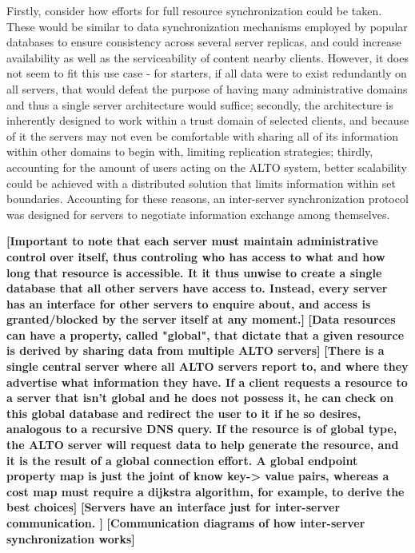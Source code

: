     Firstly, consider how efforts for full resource synchronization could be taken.
    These would be similar to data synchronization mechanisms employed by popular databases to ensure consistency across several server replicas, and could increase availability as well as the serviceability of content nearby clients.
    However, it does not seem to fit this use case - for starters, if all data were to exist redundantly on all servers, that would defeat the purpose of having many administrative domains and thus a single server architecture would suffice; secondly, the architecture is inherently designed to work within a trust domain of selected clients, and because of it the servers may not even be comfortable with sharing all of its information within other domains to begin with, limiting replication strategies; thirdly, accounting for the amount of users acting on the ALTO system, better scalability could be achieved with a distributed solution that limits information within set boundaries.
    Accounting for these reasons, an inter-server synchronization protocol was designed for servers to negotiate information exchange among themselves.

    \textbf{[Important to note that each server must maintain administrative control over itself, thus controling who has access to what and how long that resource is accessible. It it thus unwise to create a single database that all other servers have access to. Instead, every server has an interface for other servers to enquire about, and access is granted/blocked by the server itself at any moment.]}
    \textbf{[Data resources can have a property, called "global", that dictate that a given resource is derived by sharing data from multiple ALTO servers]}
    \textbf{[There is a single central server where all ALTO servers report to, and where they advertise what information they have. If a client requests a resource to a server that isn't global and he does not possess it, he can check on this global database and redirect the user to it if he so desires, analogous to a recursive DNS query. If the resource is of global type, the ALTO server will request data to help generate the resource, and it is the result of a global connection effort. A global endpoint property map is just the joint of know key-> value pairs, whereas a cost map must require a dijkstra algorithm, for example, to derive the best choices]}
    \textbf{[Servers have an interface just for inter-server communication. ]}
    \textbf{[Communication diagrams of how inter-server synchronization works]}

